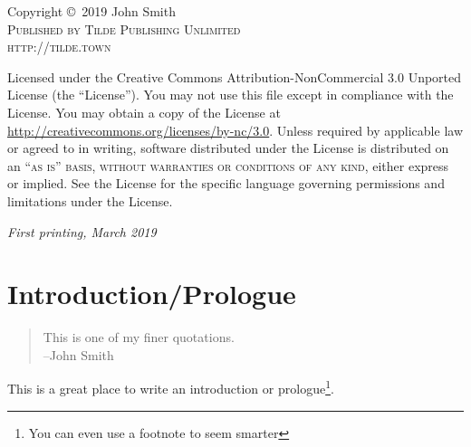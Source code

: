 \documentclass[oneside,11pt]{memoir} %
\begin{document}
\noindent Copyright \copyright\ 2019 John Smith\\ %

\noindent \textsc{Published by Tilde Publishing Unlimited}\\ %

\noindent \textsc{http://tilde.town}\\ %

\begin{tiny}
\noindent Licensed under the Creative Commons Attribution-NonCommercial 3.0 Unported License (the ``License''). You may not use this file except in compliance with the License. You may obtain a copy of the License at \url{http://creativecommons.org/licenses/by-nc/3.0}. Unless required by applicable law or agreed to in writing, software distributed under the License is distributed on an \textsc{``as is'' basis, without warranties or conditions of any kind}, either express or implied. See the License for the specific language governing permissions and limitations under the License.\\ %
\end{tiny}

\noindent \textit{First printing, March 2019} %



\tableofcontents %


\chapter*{Introduction/Prologue} %
\begin{quote}
This is one of my finer quotations.\\
--John Smith
\end{quote}

This is a great place to write an introduction or prologue\footnote{You can even use a footnote to seem smarter}.
%
\end{document}
